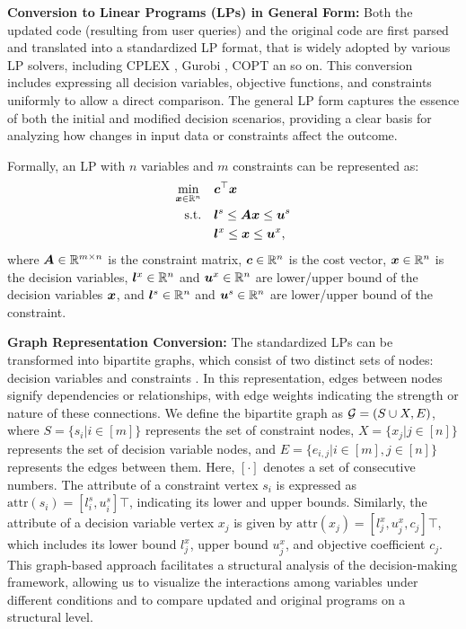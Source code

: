\textbf{Conversion to Linear Programs (LPs) in General Form:} Both the updated code (resulting from user queries) and the original code are first parsed and translated into a standardized LP format, that is widely adopted by various LP solvers, including CPLEX \citep{cplex2009v12}, Gurobi \citep{bixby2007gurobi}, COPT \citep{copt} an so on. This conversion includes expressing all decision variables, objective functions, and constraints uniformly to allow a direct comparison. The general LP form captures the essence of both the initial and modified decision scenarios, providing a clear basis for analyzing how changes in input data or constraints affect the outcome.

Formally, an LP with $n$ variables and $m$ constraints can be represented as:
\begin{align}
\min_{{\bm{x}} \in \mathbb{R}^n} & \quad {\bm{c}}^\top {\bm{x}}
\nonumber\\
\text{s.t.} & \quad {\bm{l}}^s \leq {\bm{A}}{\bm{x}} \leq {\bm{u}}^s \nonumber\\
&\quad {\bm{l}}^x \leq {\bm{x}} \leq {\bm{u}}^x, \nonumber
\end{align}
where ${\bm{A}} \in \mathbb{R}^{m\times n}$ is the constraint matrix, ${\bm{c}} \in \mathbb{R}^n$ is the cost vector, ${\bm{x}} \in \mathbb{R}^n$ is the decision variables, ${\bm{l}}^x \in \mathbb{R}^n$ and ${\bm{u}}^x \in \mathbb{R}^n$ are lower/upper bound of the decision variables ${\bm{x}}$, and ${\bm{l}}^s \in \mathbb{R}^n$ and ${\bm{u}}^s \in \mathbb{R}^n$ are lower/upper bound of the constraint.

\textbf{Graph Representation Conversion:} The standardized LPs can be transformed into bipartite graphs, which consist of two distinct sets of nodes: decision variables and constraints \citep{gasse2019exact,fan2023smart,xing2024towards}. In this representation, edges between nodes signify dependencies or relationships, with edge weights indicating the strength or nature of these connections. We define the bipartite graph as ${\mathcal{G}} = (S \cup X, E)$, where $S = \{s_i|i\in [m]\}$ represents the set of constraint nodes, $X = \{x_j|j\in [n]\}$ represents the set of decision variable nodes, and $E = \{e_{i,j}|i\in[m], j\in[n]\}$ represents the edges between them. Here, $[\cdot]$ denotes a set of consecutive numbers. The attribute of a constraint vertex $s_i$ is expressed as $\text{attr}(s_i)=[l_i^s, u_i^s]\top$, indicating its lower and upper bounds. Similarly, the attribute of a decision variable vertex $x_j$ is given by $\text{attr}(x_j)=[l_j^x, u_j^x, c_j]\top$, which includes its lower bound $l_j^x$, upper bound $u_j^x$, and objective coefficient $c_j$. This graph-based approach facilitates a structural analysis of the decision-making framework, allowing us to visualize the interactions among variables under different conditions and to compare updated and original programs on a structural level.

